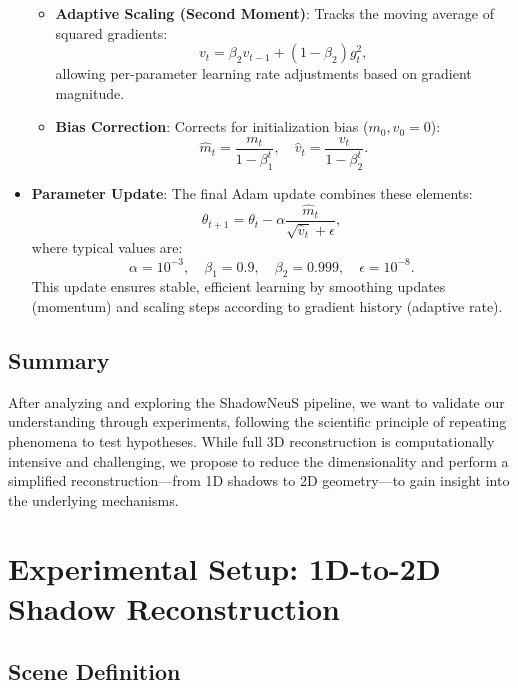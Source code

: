 \documentclass[12pt,a4paper]{article}
\theoremstyle{definition}
\begin{document}
\begin{itemize}[noitemsep, topsep=0pt]
\begin{itemize}[noitemsep]
        \item \textbf{Adaptive Scaling (Second Moment)}: Tracks the moving average of squared gradients:
        \[
        v_t = \beta_2 v_{t-1} + (1-\beta_2) g_t^2,
        \]
        allowing per-parameter learning rate adjustments based on gradient magnitude.

        \item \textbf{Bias Correction}: Corrects for initialization bias ($m_0, v_0 = 0$):
        \[
        \hat{m}_t = \frac{m_t}{1-\beta_1^t}, \quad \hat{v}_t = \frac{v_t}{1-\beta_2^t}.
        \]
    \end{itemize}

    \item \textbf{Parameter Update}: 
    The final Adam update combines these elements:
    \[
    \theta_{t+1} = \theta_t - \alpha \frac{\hat{m}_t}{\sqrt{\hat{v}_t} + \epsilon},
    \]
    where typical values are:
    \[
    \alpha = 10^{-3},\quad \beta_1 = 0.9,\quad \beta_2 = 0.999,\quad \epsilon = 10^{-8}.
    \]
    This update ensures stable, efficient learning by smoothing updates (momentum) and scaling steps according to gradient history (adaptive rate).
\end{itemize}

\vspace{-1em}

\subsection{Summary}
After analyzing and exploring the ShadowNeuS pipeline, we want to validate our understanding through experiments, following the scientific principle of repeating phenomena to test hypotheses. While full 3D reconstruction is computationally intensive and challenging, we propose to reduce the dimensionality and perform a simplified reconstruction—from 1D shadows to 2D geometry—to gain insight into the underlying mechanisms.

\vspace{-1em}

\section{Experimental Setup: 1D-to-2D Shadow Reconstruction}

\vspace{-1em}

\subsection{Scene Definition}
\end{document}
